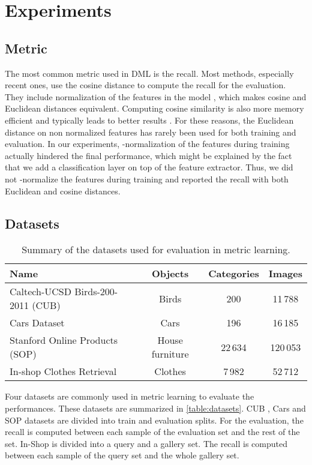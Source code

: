 \documentclass[runningheads]{llncs}
\begin{document}
%
 \section{Experiments}
\label{sec:exps}

\subsection{Metric}
The most common metric used in DML is the recall.
Most methods, especially recent ones, use the cosine distance to compute the recall for the evaluation. They include  normalization of the features in the model \cite{oh2017deep, movshovitz2017no, wang2017deep, opitz2017bier, ge2018deep, yuan2017hard, xuan2020improved, zhai2018classification, wang2019multi, sanakoyeu2019divide, xuan2018deep}, which makes cosine and Euclidean distances equivalent. Computing cosine similarity is also more memory efficient and typically leads to better results \cite{schroff2015facenet}. For these reasons, the Euclidean distance on non normalized features has rarely been used for both training and evaluation.
In our experiments, -normalization of the features during training actually hindered the final performance, which might be explained by the fact that we add a classification layer on top of the feature extractor. Thus, we did not -normalize the features during training and reported the recall with both Euclidean and cosine distances.

\subsection{Datasets}

\setlength{\tabcolsep}{5pt}
\begin{table}[t]
\centering
\caption{Summary of the datasets used for evaluation in metric learning.}
\label{table:datasets}
\begin{tabularx}{\textwidth}{lccc}
Name & Objects & Categories & Images \\ 
\toprule
Caltech-UCSD Birds-200-2011 (CUB)\cite{WahCUB_200_2011} & Birds & 200 & 11\,788 \\
Cars Dataset \cite{krause20133d} & Cars & 196 & 16\,185 \\
Stanford Online Products (SOP) \cite{song2016deep} & House furniture & 22\,634 & 120\,053 \\
In-shop Clothes Retrieval \cite{liu2016deepfashion} & Clothes & 7\,982 & 52\,712 \\
\bottomrule
\end{tabularx}
\end{table}
Four datasets are commonly used in metric learning to evaluate the performances. These datasets are summarized in \autoref{table:datasets}. CUB \cite{WahCUB_200_2011}, Cars \cite{krause20133d} and SOP \cite{song2016deep} datasets are divided into train and evaluation splits. For the evaluation, the recall is computed between each sample of the evaluation set and the rest of the set. In-Shop \cite{liu2016deepfashion} is divided into a query and a gallery set. The recall is computed between each sample of the query set and the whole gallery set.
\end{document}
